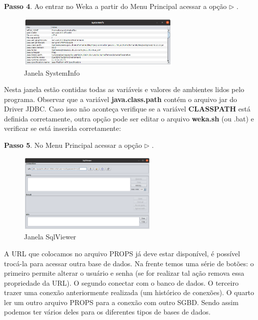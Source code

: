 \documentclass[a4paper,11pt]{article}
\begin{document}
\textbf{Passo 4}. Ao entrar no Weka a partir do Menu Principal acessar a opção  $\triangleright$ . 
\begin{figure}[H]
	\centering
	\includegraphics[width=0.7\textwidth]{imagem/systemInfo.png}
	\caption{Janela SystemInfo}
\end{figure}

Nesta janela estão contidas todas as variáveis e valores de ambientes lidos pelo programa. Observar que a variável \textbf{java.class.path} contém o arquivo jar do Driver JDBC. Caso isso não aconteça verifique se a variável \textbf{CLASSPATH} está definida corretamente, outra opção pode ser editar o arquivo \textbf{weka.sh} (ou .bat) e verificar se está inserida corretamente: \\

\textbf{Passo 5}. No Menu Principal acessar a opção  $\triangleright$ . 
\begin{figure}[H]
	\centering
	\includegraphics[width=0.6\textwidth]{imagem/SqlViewer.png}
	\caption{Janela SqlViewer}
\end{figure}

A URL que colocamos no arquivo PROPS já deve estar disponível, é possível trocá-la para acessar outra base de dados. Na frente temos uma série de botões: o primeiro permite alterar o usuário e senha (se for realizar tal ação remova essa propriedade da URL). O segundo conectar com o banco de dados. O terceiro trazer uma conexão anteriormente realizada (um histórico de conexões). O quarto ler um outro arquivo PROPS para a conexão com outro SGBD. Sendo assim podemos ter vários deles para os diferentes tipos de bases de dados.
\end{document}
